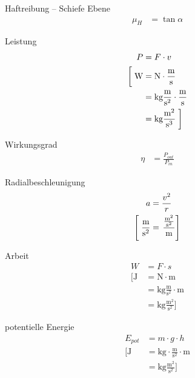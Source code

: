 \begin{karte}{Haftreibung -- Schiefe Ebene}
    \begin{align*}
        \mu_H &= \tan \alpha
    \end{align*}
\end{karte}

\begin{karte}{Leistung}
    \begin{align*}
        P &= F \cdot v \\
        \left[ \vphantom{\frac{m^2}{s^3}} \right.
            \text{W} &= 
            \text{N} \cdot \frac{\text{m}}{\text{s}} \\
            &= \text{kg} \frac{\text{m}}{\text{s}^2} \cdot \frac{\text{m}}{\text{s}} \\
            &= \text{kg} \frac{\text{m}^2}{\text{s}^3} 
            \left. \vphantom{\frac{m^2}{s^3}} \right]
    \end{align*}
\end{karte}

\begin{karte}{Wirkungsgrad}
    \begin{align*}
        \eta &= \frac{P_{out}}{P_{in}}
    \end{align*}
\end{karte}

\begin{karte}{Radialbeschleunigung}
    \begin{align*}
        a &= \frac{v^2}{r} \\
        \left[ \vphantom{\frac{\frac{\text{m}^2}{\text{s}^2}}{\text{m}}} \right.
            \frac{\text{m}}{\text{s}^2} &= \left.  \frac{\frac{\text{m}^2}{\text{s}^2}}{\text{m}} 
             \right]
    \end{align*}
\end{karte}

\begin{karte}{Arbeit}
    \begin{align*}
        W &= F \cdot s \\
        \bigg[
            \text{J} &= \text{N} \cdot \text{m} \\
            &= \text{kg}\frac{\text{m}}{\text{s}^2} \cdot \text{m}\\
            &= \text{kg}\frac{\text{m}^2}{\text{s}^2}  
            \bigg]
    \end{align*}
\end{karte}

\begin{karte}{potentielle Energie}
    \begin{align*}
        E_{pot} &= m \cdot g \cdot h \\
        \bigg[
            \text{J} &= \text{kg} \cdot \frac{\text{m}}{\text{s}^2} \cdot \text{m} \\
            &= \text{kg}\frac{\text{m}^2}{\text{s}^2} 
            \bigg]
    \end{align*}
\end{karte}

